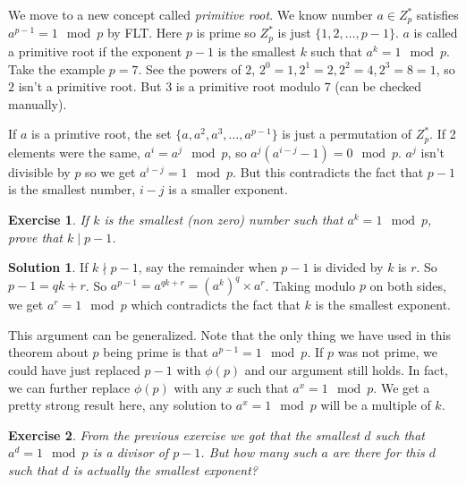 \documentclass[a4paper,10pt]{article}
\newtheorem{exercise}{Exercise}[section]
\theoremstyle{definition} %
\newtheorem*{solution}{Solution}
\begin{document}
    We move to a new concept called \emph{primitive root}. We know number $a \in Z_p^*$
    satisfies $a^{p-1} = 1 \mod p$ by FLT. Here $p$ is prime so $Z_p^*$ is just $\{1, 2, 
    \dots, p-1\}$. $a$ is called a primitive root if the exponent $p-1$ is the smallest $k$
    such that $a^{k} = 1 \mod p$. Take the example $p = 7$. See the powers of $2$, $2^0 = 1,
    2^1 = 2, 2^2 = 4, 2^3 = 8 = 1$, so $2$ isn't a primitive root. But $3$ is a primitive root 
    modulo $7$ (can be checked manually).

    If $a$ is a primtive root, the set $\{a,a^2, a^3, \dots, a^{p-1}\}$ is just a permutation 
    of $Z_p^*$. If 2 elements were the same, $a^i = a^j \mod p$, so $a^j(a^{i-j} - 1) = 0 \mod p$.
    $a^j$ isn't divisible by $p$ so we get $a^{i-j} = 1 \mod p$. But this contradicts the fact that
    $p-1$ is the smallest number, $i-j$ is a smaller exponent.

    \begin{exercise}
        If $k$ is the smallest (non zero) number such that $a^k = 1 \mod p$, prove that $k \mid p-1$.
    \end{exercise}

    \begin{solution}
        If $k \nmid p-1$, say the remainder when $p-1$ is divided by $k$ is $r$. So 
        $p-1 = qk + r$. So $a^{p-1} = a^{qk+r} = {(a^k)}^q \times a^r$. Taking modulo $p$
        on both sides, we get $a^r = 1 \mod p$ which contradicts the fact that $k$ is the 
        smallest exponent. 

        This argument can be generalized. Note that the only thing we have used in this theorem 
        about $p$ being prime is that $a^{p-1} = 1 \mod p$. If $p$ was not prime, we could have just
        replaced $p-1$ with $\phi(p)$ and our argument still holds. In fact, we can further replace
        $\phi(p)$ with any $x$ such that $a^x = 1 \mod p$. We get a pretty strong result here, any solution
        to $a^x = 1 \mod p$ will be a multiple of $k$.


    \end{solution}

    \begin{exercise}
        From the previous exercise we got that the smallest $d$ such that $a^d = 1 \mod p$
        is a divisor of $p-1$. But how many such $a$ are there for this $d$ such that $d$ is 
        actually the smallest exponent?
    \end{exercise}
\end{document}
